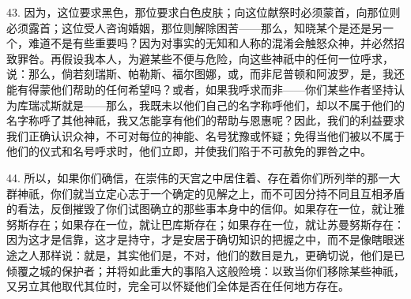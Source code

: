 43. 因为，这位要求黑色，那位要求白色皮肤；向这位献祭时必须蒙首，向那位则必须露首；这位受人咨询婚姻，那位则解除困苦——那么，知晓某个是还是另一个，难道不是有些重要吗？因为对事实的无知和人称的混淆会触怒众神，并必然招致罪咎。再假设我本人，为避某些不便与危险，向这些神祇中的任何一位呼求，说：那么，倘若刻瑞斯、帕勒斯、福尔图娜，或，而非尼普顿和阿波罗，是，我还能有得蒙他们帮助的任何希望吗？或者，如果我呼求而非——你们某些作者坚持认为库瑞忒斯就是——那么，我既未以他们自己的名字称呼他们，却以不属于他们的名字称呼了其他神祇，我又怎能享有他们的帮助与恩惠呢？因此，我们的利益要求我们正确认识众神，不可对每位的神能、名号犹豫或怀疑；免得当他们被以不属于他们的仪式和名号呼求时，他们立即，并使我们陷于不可赦免的罪咎之中。\par

44. 所以，如果你们确信，在崇伟的天宫之中居住着、存在着你们所列举的那一大群神祇，你们就当立定心志于一个确定的见解之上，而不可因分持不同且互相矛盾的看法，反倒摧毁了你们试图确立的那些事本身中的信仰。如果存在一位，就让雅努斯存在；如果存在一位，就让巴库斯存在；如果存在一位，就让苏曼努斯存在：因为这才是信靠，这才是持守，才是安居于确切知识的把握之中，而不是像瞎眼迷途之人那样说：就是，其实他们是，不对，他们的数目是九，更确切说，他们是已倾覆之城的保护者；并将如此重大的事陷入这般险境：以致当你们移除某些神祇，又另立其他取代其位时，完全可以怀疑他们全体是否在任何地方存在。\par



\section{}

